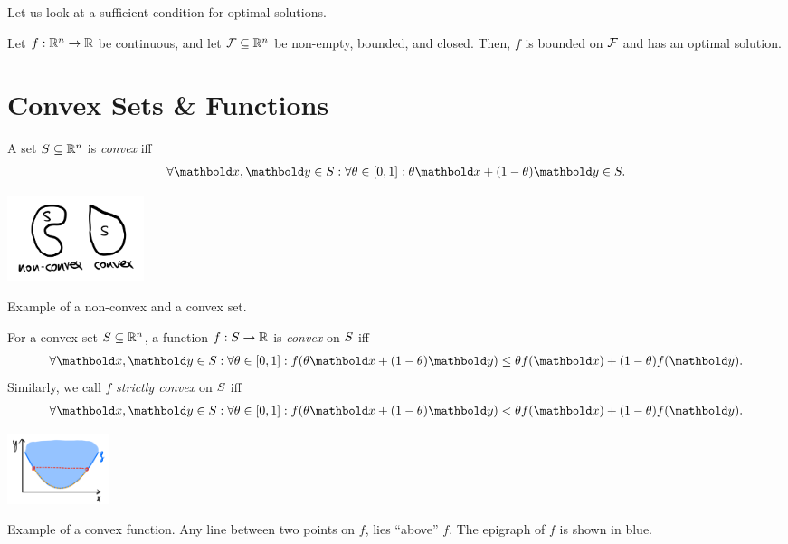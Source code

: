 Let us look at a sufficient condition for optimal solutions. \begin{thm}\label{thm:extreme_value_theorem}
Let $f : \mathbb{R}^n \to \mathbb{R}$ be continuous, and let $\mathcal{F} \subseteq \mathbb{R}^n$ be non-empty, bounded, and closed. Then, $f$ is bounded on $\mathcal{F}$ and has an optimal solution.
\end{thm}

\section{Convex Sets \& Functions}

\begin{defn} A set $S \subseteq \mathbb{R}^n$ is \emph{convex} iff \begin{align}
    \forall \vx, \vy \in \sS: \forall \theta \in [0,1]: \theta\vx + (1-\theta)\vy \in \sS.
\end{align}
\end{defn}
\begin{marginfigure}
\centering\includegraphics[width=4cm]{notes/figures/convex_set.png}
\caption{Example of a non-convex and a convex set.}
\end{marginfigure}
\begin{defn} For a convex set $S \subseteq \mathbb{R}^n$, a function $f : S \to \mathbb{R}$ is \emph{convex} on $S$ iff \begin{align}
    \forall \vx, \vy \in \sS: \forall \theta \in [0,1]: f(\theta\vx + (1-\theta)\vy) \leq \theta f(\vx) + (1-\theta) f(\vy).
\end{align} Similarly, we call $f$ \emph{strictly convex} on $S$ iff \begin{align}
    \forall \vx, \vy \in \sS: \forall \theta\in[0,1]: f(\theta\vx + (1-\theta)\vy) < \theta f(\vx) + (1-\theta) f(\vy).
\end{align}
\end{defn}
\begin{marginfigure}
\centering\includegraphics[width=3cm]{notes/figures/convex_function.png}
\caption{Example of a convex function. Any line between two points on $f$, lies ``above'' $f$. The epigraph of $f$ is shown in blue.}
\end{marginfigure}

